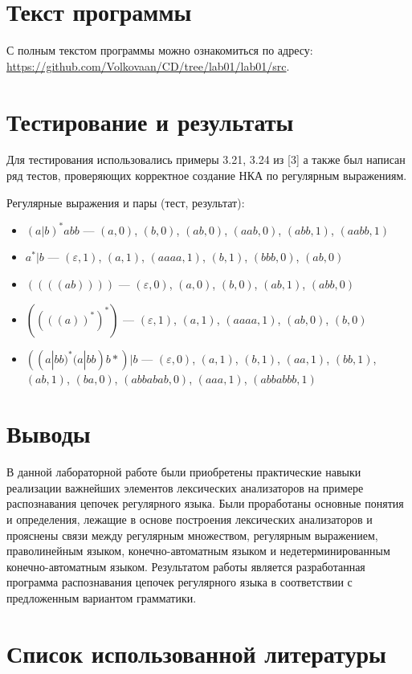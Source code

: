 \documentclass{bmstu-gost-7-32}
\begin{document}
\section*{Текст программы}

С полным текстом программы можно ознакомиться по адресу: \url{https://github.com/Volkovaan/CD/tree/lab01/lab01/src}.

\section*{Тестирование и результаты}

Для тестирования использовались примеры 3.21, 3.24 из [3] а также был написан ряд тестов, проверяющих корректное создание НКА по регулярным выражениям.

Регулярные выражения и пары (тест, результат):
\begin{itemize}
	\item $(a|b)^*abb$ — $(a, 0)$, $(b, 0)$, $(ab, 0)$, $(aab, 0)$, $(abb, 1)$, $(aabb, 1)$
	\item $a^*|b$ — $(\varepsilon, 1)$, $(a, 1)$, $(aaaa, 1)$, $(b, 1)$, $(bbb, 0)$, $(ab, 0)$
	\item $((((ab))))$ — $(\varepsilon, 0)$, $(a, 0)$, $(b, 0)$, $(ab, 1)$, $(abb, 0)$
	\item $((((a))^*)^*)$ — $(\varepsilon, 1)$, $(a, 1)$, $(aaaa, 1)$, $(ab, 0)$, $(b, 0)$
	\item $((a|bb)^*(a|bb)b*)|b$ — $(\varepsilon, 0)$, $(a, 1)$, $(b, 1)$, $(aa, 1)$, $(bb, 1)$, $(ab, 1)$, $(ba, 0)$, $(abbabab, 0)$, $(aaa, 1)$, $(abbabbb, 1)$
\end{itemize}

\section*{Выводы}

В данной лабораторной работе были приобретены практические навыки реализации важнейших элементов лексических анализаторов на примере распознавания цепочек регулярного языка.
Были проработаны основные понятия и определения, лежащие в основе построения лексических анализаторов и прояснены связи между регулярным множеством, регулярным выражением, праволинейным языком, конечно-автоматным языком и недетерминированным конечно-автоматным языком. Результатом работы является разработанная программа распознавания цепочек регулярного языка в соответствии с предложенным вариантом грамматики.

\section*{Список использованной литературы}
\end{document}
